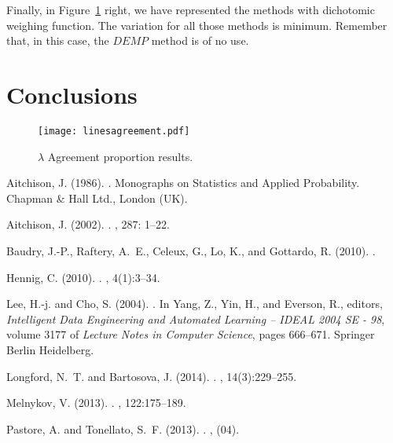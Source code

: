 \documentclass[10pt, a4paper]{article}
\begin{document}
Finally, in Figure~\ref{fig:mub} right, we have represented the methods with dichotomic weighing function. The variation for all those methods is minimum. Remember that, in this case, the $DEMP$ method is of no use.

\section{Conclusions}
\label{conclusions}

\begin{figure}[!h]
\centering
\texttt{[image: linesagreement.pdf]}
\caption{$\lambda$ Agreement proportion results.}
\label{fig:mub}
\end{figure}



\begin{thebibliography}{}

Aitchison, J. (1986).
.
\newblock Monographs on Statistics and Applied Probability. Chapman \& Hall
  Ltd., London (UK).

Aitchison, J. (2002).
.
, 287: 1--22.

Baudry, J.-P., Raftery, A.~E., Celeux, G., Lo, K., and Gottardo, R. (2010).
.

Hennig, C. (2010).
.
, 4(1):3--34.

Lee, H.-j. and Cho, S. (2004).
.
\newblock In Yang, Z., Yin, H., and Everson, R., editors, {\em Intelligent Data
  Engineering and Automated Learning – IDEAL 2004 SE - 98}, volume 3177 of
  {\em Lecture Notes in Computer Science}, pages 666--671. Springer Berlin
  Heidelberg.

Longford, N.~T. and Bartosova, J. (2014).
.
, 14(3):229--255.

Melnykov, V. (2013).
.
, 122:175--189.

Pastore, A. and Tonellato, S.~F. (2013).
.
, (04).

\end{thebibliography}
\end{document}
